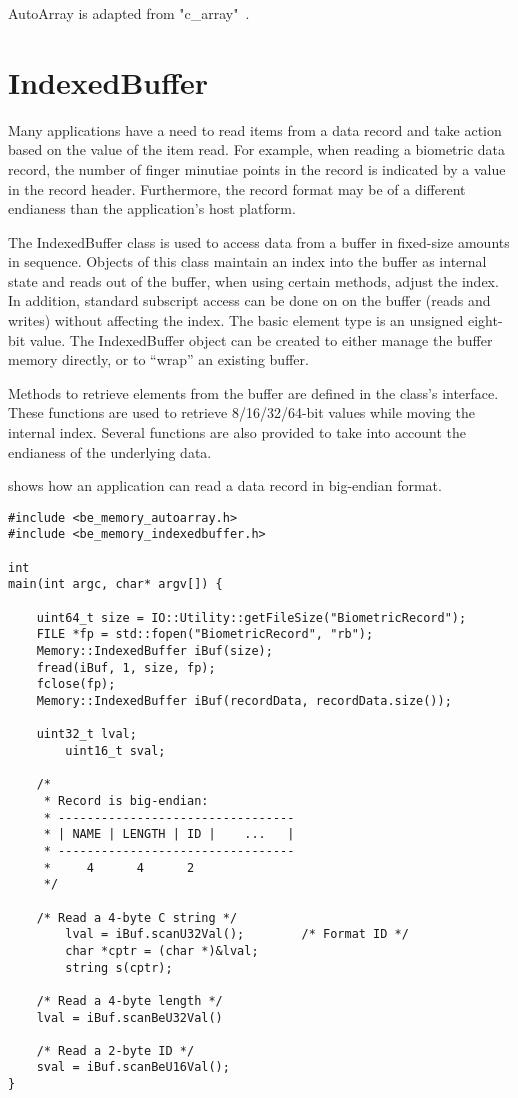 AutoArray is adapted from "c\_array"~\cite[496]{cpp:plguide}.

\section{IndexedBuffer}
\label{sec-indexedbuffer}
Many applications have a need to read items from a data record and take
action based on the value of the item read. For example, when reading a
biometric data record, the number of finger minutiae points in the record
is indicated by a value in the record header. Furthermore, the record format
may be of a different endianess than the application's host platform.

The IndexedBuffer class is used to access data from a buffer in fixed-size
amounts in sequence. Objects of this class maintain an index into the buffer
as internal state and reads out of the buffer, when using certain methods,
adjust the index. In addition, standard subscript access can be done on
on the buffer (reads and writes) without affecting the index. The basic element
type is an unsigned eight-bit value.
The IndexedBuffer object can be created to either manage the buffer memory
directly, or to ``wrap'' an existing buffer. 

Methods to retrieve elements from the buffer are defined in the class's
interface. These functions are used to retrieve 8/16/32/64-bit values while
moving the internal index. Several functions are also provided to take into
account the endianess of the underlying data.

 shows how an application can read a data record in
big-endian format.

\begin{lstlisting}[caption={Using the IndexedBuffer}, label=indexedbufferuse]
#include <be_memory_autoarray.h>
#include <be_memory_indexedbuffer.h>

int
main(int argc, char* argv[]) {

	uint64_t size = IO::Utility::getFileSize("BiometricRecord");
	FILE *fp = std::fopen("BiometricRecord", "rb");
	Memory::IndexedBuffer iBuf(size);
	fread(iBuf, 1, size, fp);
	fclose(fp);
	Memory::IndexedBuffer iBuf(recordData, recordData.size());

	uint32_t lval;
        uint16_t sval;

	/*
	 * Record is big-endian:
	 * ---------------------------------
	 * | NAME | LENGTH | ID |    ...   |
	 * ---------------------------------
	 *     4      4      2
	 */

	/* Read a 4-byte C string */
        lval = iBuf.scanU32Val();        /* Format ID */
        char *cptr = (char *)&lval;
        string s(cptr);

	/* Read a 4-byte length */
	lval = iBuf.scanBeU32Val()

	/* Read a 2-byte ID */
	sval = iBuf.scanBeU16Val();
}
\end{lstlisting}
